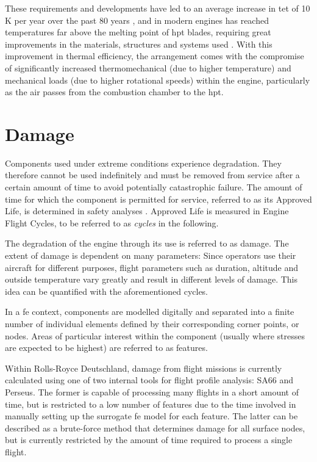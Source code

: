 These requirements and developments have led to an average increase in \ac{tet} of 10 K per year over the past 80 years \cite[]{kyprianidis_future_2011}, and in modern engines has reached temperatures far above the melting point of \ac{hpt} blades, requiring great improvements in the materials, structures and systems used \cite[]{spittle_gas_2003}. With this improvement in thermal efficiency, the arrangement comes with the compromise of significantly increased thermomechanical (due to higher temperature) and mechanical loads (due to higher rotational speeds) within the engine, particularly as the air passes from the combustion chamber to the \ac{hpt}.

\section{Damage}\label{damage}
Components used under extreme conditions experience degradation. They therefore cannot be used indefinitely and must be removed from service after a certain amount of time to avoid potentially catastrophic failure. The amount of time for which the component is permitted for service, referred to as its Approved Life, is determined in safety analyses \cite[]{easa_certification_2015}. Approved Life is measured in Engine Flight Cycles, to be referred to as \textit{cycles} in the following.

The degradation of the engine through its use is referred to as damage. The extent of damage is dependent on many parameters: Since operators use their aircraft for different purposes, flight parameters such as duration, altitude and outside temperature vary greatly and result in different levels of damage. This idea can be quantified with the aforementioned cycles.

In a \ac{fe} context, components are modelled digitally and separated into a finite number of individual elements defined by their corresponding corner points, or nodes. Areas of particular interest within the component (usually where stresses are expected to be highest) are referred to as features.

Within Rolls-Royce Deutschland, damage from flight missions is currently calculated using one of two internal tools for flight profile analysis: SA66 and Perseus. The former is capable of processing many flights in a short amount of time, but is restricted to a low number of features due to the time involved in manually setting up the surrogate \ac{fe} model for each feature. The latter can be described as a brute-force method that determines damage for all surface nodes, but is currently restricted by the amount of time required to process a single flight.


